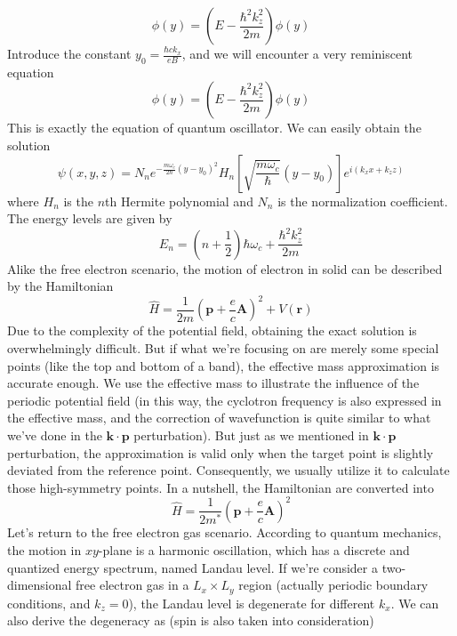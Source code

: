 \documentclass{article}
\begin{document}
\begin{equation}
    [-\frac{\hbar^2}{2m}\frac{\partial^2}{\partial{y^2}}+\frac{1}{2m}(\hbar{k}_x-\frac{eBy}{c})^2]\phi(y)=(E-\frac{\hbar^2k_z^2}{2m})\phi(y)
\end{equation}Introduce the constant $y_0=\frac{\hbar{c}k_x}{eB}$, and we will encounter a very reminiscent equation\begin{equation}
    [-\frac{\hbar^2}{2m}\frac{\partial^2}{\partial{y^2}}+\frac12m\omega_c^2(y-y_0)^2]\phi(y)=(E-\frac{\hbar^2k_z^2}{2m})\phi(y)
\end{equation}This is exactly the equation of quantum oscillator. We can easily obtain the solution\begin{equation}
    \psi(x,y,z)=N_ne^{-\frac{m\omega_c}{2\hbar}(y-y_0)^2}H_n[\sqrt{\frac{m\omega_c}{\hbar}}(y-y_0)]e^{i(k_xx+k_zz)}
\end{equation}where $H_n$ is the $n$th Hermite polynomial and $N_n$ is the normalization coefficient. The energy levels are given by\begin{equation}
    E_n=(n+\frac12)\hbar\omega_c+\frac{\hbar^2k_z^2}{2m}
\end{equation}Alike the free electron scenario, the motion of electron in solid can be described by the Hamiltonian\begin{equation}
    \hat{H}=\frac{1}{2m}(\mathbf{p}+\frac{e}{c}\mathbf{A})^2+V(\mathbf{r})
\end{equation}Due to the complexity of the potential field, obtaining the exact solution is overwhelmingly difficult. But if what we're focusing on are merely some special points (like the top and bottom of a band), the effective mass approximation is accurate enough. We use the effective mass to illustrate the influence of the periodic potential field (in this way, the cyclotron frequency is also expressed in the effective mass, and the correction of wavefunction is quite similar to what we've done in the $\mathbf{k}\cdot\mathbf{p}$ perturbation). But just as we mentioned in $\mathbf{k}\cdot\mathbf{p}$ perturbation, the approximation is valid only when the target point is slightly deviated from the reference point. Consequently, we usually utilize it to calculate those high-symmetry points. In a nutshell, the Hamiltonian are converted into\begin{equation}
    \hat{H}=\frac{1}{2m^*}(\mathbf{p}+\frac{e}{c}\mathbf{A})^2
\end{equation}Let's return to the free electron gas scenario. According to quantum mechanics, the motion in $xy$-plane is a harmonic oscillation, which has a discrete and quantized energy spectrum, named Landau level. If we're consider a two-dimensional free electron gas in a $L_x\times{L_y}$ region (actually periodic boundary conditions, and $k_z=0$), the Landau level is degenerate for different $k_x$. We can also derive the degeneracy as (spin is also taken into consideration)\begin{equation}

\end{equation}
\end{document}
